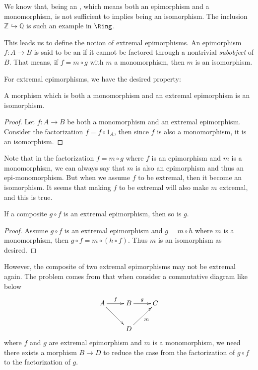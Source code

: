   We know that, being an , which means both an epimorphism and a monomorphism, is not sufficient to implies being an isomorphism. The inclusion $\mathbb{Z}\hookrightarrow\mathbb{Q}$ is such an example in $\Ring$.

  This leads us to define the notion of extremal epimorphisms. An epimorphism $f\colon A\to B$ is said to be an  if it cannot be factored through a nontrivial \emph{subobject} of $B$. That means, if $f=m\circ g$ with $m$ a monomorphism, then $m$ is an isomorphism.

  For extremal epimorphisms, we have the desired property:
  \begin{prop}\label{prop:extremal+mono=iso}
    A morphism which is both a monomorphism and an extremal epimorphism is an isomorphism.
  \end{prop}
  \begin{proof}
    Let $f\colon A\to B$ be both a monomorphism and an extremal epimorphism. Consider the factorization $f = f\circ 1_A$, then since $f$ is also a monomorphism, it is an isomorphism.
  \end{proof}

  Note that in the factorization $f = m\circ g$ where $f$ is an epimorphism and $m$ is a monomorphism, we can always say that $m$ is also an epimorphism and thus an epi-monomorphism. But when we assume $f$ to be extremal, then it become an isomorphism. It seems that making $f$ to be extremal will also make $m$ extremal, and this is true.
  \begin{prop}
    If a composite $g\circ f$ is an extremal epimorphism, then so is $g$.
  \end{prop}
  \begin{proof}
    Assume $g\circ f$ is an extremal epimorphism and $g = m\circ h$ where $m$ is a monomorphism, then $g\circ f = m\circ (h\circ f)$. Thus $m$ is an isomorphism as desired.
  \end{proof}
  However, the composite of two extremal epimorphisms may not be extremal again. The problem comes from that when consider a commutative diagram like below
        \begin{displaymath}
          \xymatrix{
            A\ar[r]^{f}\ar[dr]&B\ar[r]^{g}&C\\
            &D\ar[ur]_{m}&
          }
        \end{displaymath}
  where $f$ and $g$ are extremal epimorphism and $m$ is a monomorphism, we need there exists a morphism $B\to D$ to reduce the case from the factorization of $g\circ f$ to the factorization of $g$.

